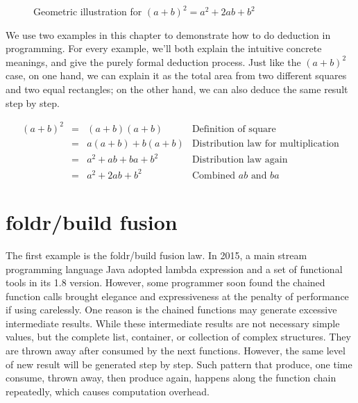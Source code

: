 \documentclass{article}
\begin{document}
\begin{figure}[htbp]
\centering
{}
\caption{Geometric illustration for $(a + b)^2 = a^2 + 2ab + b^2$}
\end{figure}

We use two examples in this chapter to demonstrate how to do deduction in programming. For every example, we'll both explain the intuitive concrete meanings, and give the purely formal deduction process. Just like the $(a+b)^2$ case, on one hand, we can explain it as the total area from two different squares and two equal rectangles; on the other hand, we can also deduce the same result step by step.

\[
\begin{array}{rcll}
(a + b)^2 & = & (a + b)(a + b) & \text{Definition of square} \\
          & = & a(a + b) + b(a + b) & \text{Distribution law for multiplication} \\
          & = & a^2 + ab + ba + b^2 & \text{Distribution law again} \\
          & = & a^2 + 2ab + b^2 & \text{Combined $ab$ and $ba$}
\end{array}
\]

\section{foldr/build fusion}

The first example is the foldr/build fusion law. In 2015, a main stream programming language Java adopted lambda expression and a set of functional tools in its 1.8 version. However, some programmer soon found the chained function calls brought elegance and expressiveness at the penalty of performance if using carelessly. One reason is the chained functions may generate excessive intermediate results. While these intermediate results are not necessary simple values, but the complete list, container, or collection of complex structures. They are thrown away after consumed by the next functions. However, the same level of new result will be generated step by step. Such pattern that produce, one time consume, thrown away, then produce again, happens along the function chain repeatedly, which causes computation overhead.
\end{document}
